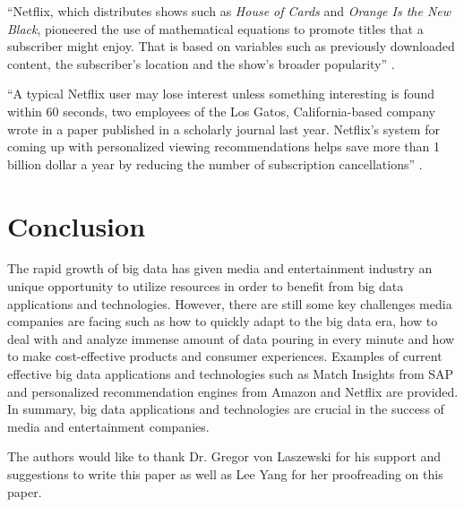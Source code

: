 \documentclass[sigconf]{acmart}
\begin{document}
``Netflix, which distributes shows such as {\em House of Cards} and {\em Orange Is the New Black}, pioneered the use of mathematical equations to promote titles that a subscriber might enjoy. That is based on variables such as previously downloaded content, the subscriber's location and the show's broader popularity'' \cite{Whitley2016data}.

``A typical Netflix user may lose interest unless something interesting is found within 60 seconds, two employees of the Los Gatos, California-based company wrote in a paper published in a scholarly journal last year. Netflix's system for coming up with personalized viewing recommendations helps save more than 1 billion dollar a year by reducing the number of subscription cancellations'' \cite{Whitley2016data}. 

\section{Conclusion}

The rapid growth of big data has given media and entertainment industry an unique opportunity to utilize resources in order to benefit from big data applications and technologies. However, there are still some key challenges media companies are facing such as how to quickly adapt to the big data era, how to deal with and analyze immense amount of data pouring in every minute and how to make cost-effective products and consumer experiences. Examples of current effective big data applications and technologies such as Match Insights from SAP and personalized recommendation engines from Amazon and Netflix are provided. In summary, big data applications and technologies are crucial in the success of media and entertainment companies. 

\begin{acks}

  The authors would like to thank Dr. Gregor von Laszewski for his support and suggestions to write this paper as well as Lee Yang for her proofreading on this paper. 

\end{acks}


 
\end{document}
